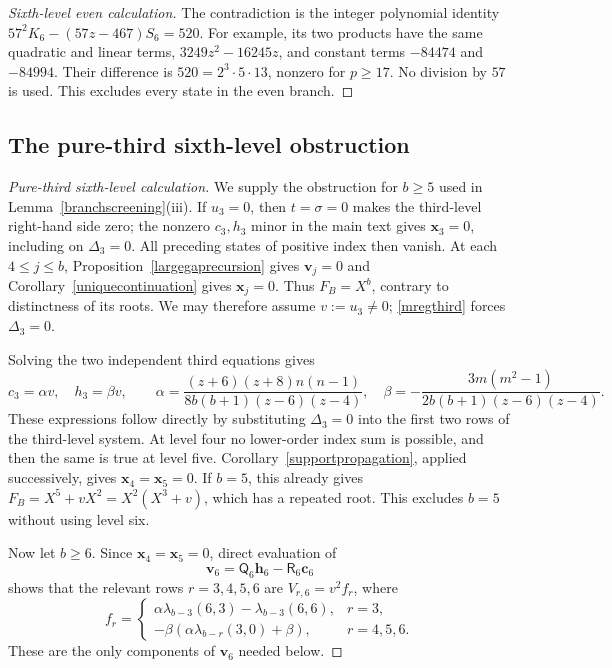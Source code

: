 \documentclass[10pt,a4paper]{amsart}
\begin{document}
\begin{proof}[Sixth-level even calculation]
The contradiction is the integer polynomial identity
$57^2K_6-(57z-467)S_6=520$.  For example, its two products have the same quadratic and linear terms,
$3249z^2-16245z$, and constant terms $-84474$ and $-84994$.
Their difference is $520=2^3\cdot5\cdot13$, nonzero for $p\ge17$.
No division by $57$ is used.  This excludes every state in the even
branch.
\end{proof}

\subsection{The pure-third sixth-level obstruction}\label{app:purethird}

\begin{proof}[Pure-third sixth-level calculation]
We supply the obstruction for $b\ge5$ used in
Lemma~\ref{branchscreening}(iii).  If $u_3=0$, then $t=\sigma=0$ makes the third-level right-hand side
zero; the nonzero $c_3,h_3$ minor in the main text gives
$\mathbf x_3=0$, including on $\Delta_3=0$.  All preceding states of positive index then vanish.
At each $4\le j\le b$, Proposition~\ref{largegaprecursion} gives
$\mathbf v_j=0$ and Corollary~\ref{uniquecontinuation} gives
$\mathbf x_j=0$.  Thus $F_B=X^b$, contrary to distinctness of its roots.
We may therefore assume $v:=u_3\ne0$; \eqref{mregthird} forces
$\Delta_3=0$.

Solving the two independent third equations gives
\begin{equation}\label{thirdprofileparameters}
 c_3=\alpha v,\quad h_3=\beta v,\qquad
 \alpha=\frac{(z+6)(z+8)n(n-1)}{8b(b+1)(z-6)(z-4)},\quad
 \beta=-\frac{3m(m^2-1)}{2b(b+1)(z-6)(z-4)}.
\end{equation}
These expressions follow directly by substituting $\Delta_3=0$ into
the first two rows of the third-level system.
At level four no lower-order index sum is possible, and then the same
is true at level five.  Corollary~\ref{supportpropagation}, applied
successively, gives $\mathbf x_4=\mathbf x_5=0$.
If $b=5$, this already gives
$F_B=X^5+vX^2=X^2(X^3+v)$, which has a repeated root.  This excludes $b=5$ without using level six.

Now let $b\ge6$.  Since $\mathbf x_4=\mathbf x_5=0$, direct
evaluation of
\[
 \mathbf v_6=\mathsf Q_6\mathbf h_6-\mathsf R_6\mathbf c_6
\]
shows that the relevant rows $r=3,4,5,6$ are $V_{r,6}=v^2f_r$, where
\begin{equation}\label{purethirdprofile}
 f_r=\begin{cases}
 \alpha\lambda_{b-3}(6,3)-\lambda_{b-3}(6,6),&r=3,\\[1mm]
 -\beta(\alpha\lambda_{b-r}(3,0)+\beta),&r=4,5,6.
 \end{cases}
\end{equation}
These are the only components of $\mathbf v_6$ needed below.


\end{proof}
\end{document}
